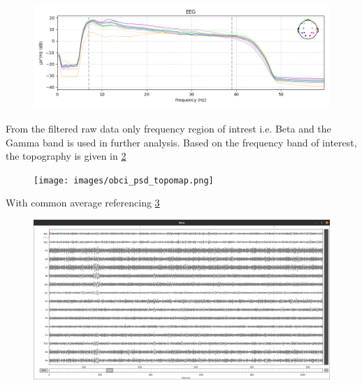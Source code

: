 \begin{figure}[h] 
    \begin{center}
    \includegraphics[height=0.6\textwidth]{images/phy_rawfltrd_psd.png}
    \caption{}
    \label{fig:phy_rawfltrd_psd}
\end{center}
\end{figure}

From the filtered raw data only frequency region of intrest i.e. Beta and the Gamma band is used in further analysis. Based on the frequency band of interest, the topography is given in \ref{fig:obci_psd_topomap}

\begin{figure}[h] 
    \begin{center}
    \texttt{[image: images/obci\_psd\_topomap.png]}
    \caption{}
    \label{fig:obci_psd_topomap}
\end{center}
\end{figure}

With common average referencing \ref{fig:obci_car}
\begin{figure}[h] 
    \begin{center}
    \includegraphics[height=0.6\textwidth]{images/obci_car.png}
    \caption{}
    \label{fig:obci_car}
\end{center}
\end{figure}

